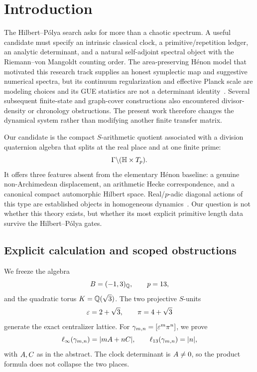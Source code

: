 \section{Introduction}

The Hilbert--P\'olya search asks for more than a chaotic spectrum.  A useful
candidate must specify an intrinsic classical clock, a primitive/repetition
ledger, an analytic determinant, and a natural self-adjoint spectral object
with the Riemann--von Mangoldt counting order.  The area-preserving H\'enon
model that motivated this research track supplies an honest symplectic map
and suggestive numerical spectra, but its continuum regularization and
effective Planck scale are modeling choices and its GUE statistics are not a
determinant identity~\cite{WangHenon2026}.  Several subsequent finite-state
and graph-cover constructions also encountered divisor-density or chronology
obstructions.  The present work therefore changes the dynamical system
rather than modifying another finite transfer matrix.

Our candidate is the compact $S$-arithmetic quotient associated with a
division quaternion algebra that splits at the real place and at one finite
prime:
\[
\Gamma\backslash(\mathbb{H}\times T_p).
\]
It offers three features absent from the elementary H\'enon baseline: a
genuine non-Archimedean displacement, an arithmetic Hecke correspondence,
and a canonical compact automorphic Hilbert space.  Real/$p$-adic diagonal
actions of this type are established objects in homogeneous
dynamics~\cite{EinsiedlerKleinbock2007,KleinbockTomanov2007}.  Our question is
not whether this theory exists, but whether its most explicit primitive
length data survive the Hilbert--P\'olya gates.

\subsection{Explicit calculation and scoped obstructions}

We freeze the algebra
\[
B=(-1,3)_{\mathbb{Q}},\qquad p=13,
\]
and the quadratic torus $K=\mathbb{Q}(\sqrt3)$.  The two projective $S$-units
\[
\varepsilon=2+\sqrt3,\qquad \pi=4+\sqrt3
\]
generate the exact centralizer lattice.  For
$\gamma_{m,n}=[\varepsilon^m\pi^n]$, we prove
\begin{equation}\label{eq:clock-intro}
 \ell_{\infty}(\gamma_{m,n})=|mA+nC|,
 \qquad
 \ell_{13}(\gamma_{m,n})=|n|,
\end{equation}
with $A,C$ as in the abstract.  The clock determinant is $A\ne0$, so
the product formula does not collapse the two places.


